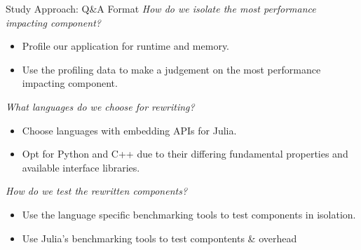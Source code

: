 \begin{frame}{Study Approach: Q\&A Format}
        \textit{How do we isolate the most performance impacting component?} 
        \begin{itemize}
            \item Profile our application for runtime and memory.
            \item Use the profiling data to make a judgement on the most performance impacting component.
        \end{itemize}
        \pause
        \textit{What languages do we choose for rewriting?}
        \begin{itemize}
            \item Choose languages with embedding APIs for Julia. 
            \item Opt for Python and C++ due to their differing fundamental properties and available interface libraries.
        \end{itemize}
        \pause
        \textit{How do we test the rewritten components?}
        \begin{itemize}
            \item Use the language specific benchmarking tools to test components in isolation.
            \item Use Julia's benchmarking tools to test compontents \& overhead 
        \end{itemize}
\end{frame}